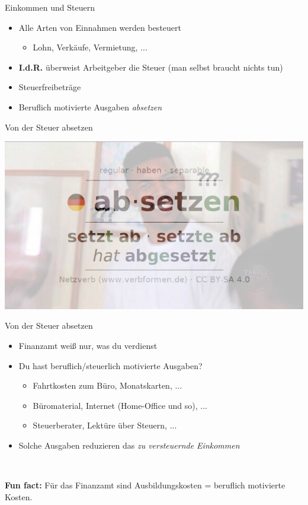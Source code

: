 \documentclass{beamer}
\newcommand{\n}{\hfill\\\vspace{0.25cm}}
\begin{document}
			\begin{frame}{Einkommen und Steuern}
				\begin{itemize}
					\item Alle Arten von Einnahmen werden besteuert
					\begin{itemize}
						\item Lohn, Verkäufe, Vermietung, ...
					\end{itemize}
					\item \textbf{I.d.R.} überweist Arbeitgeber die Steuer (man selbst braucht nichts tun)
					\item Steuerfreibeträge
					\item Beruflich motivierte Ausgaben \textit{absetzen}
				\end{itemize}
			\end{frame}
		
			\begin{frame}{Von der Steuer absetzen}
				\begin{center}
					\includegraphics[width=0.75\linewidth]{images/absetzen}
				\end{center}
			\end{frame}
		
			\begin{frame}{Von der Steuer absetzen}
				\begin{itemize}
					\item Finanzamt weiß nur, was du verdienst
					\item Du hast beruflich/steuerlich motivierte Ausgaben?
					\begin{itemize}
						\item Fahrtkosten zum Büro, Monatskarten, ...
						\item Büromaterial, Internet (Home-Office und so), ...
						\item Steuerberater, Lektüre über Steuern, ...
					\end{itemize}
					\item Solche Ausgaben reduzieren das \textit{zu versteuernde Einkommen}
				\end{itemize}\n
				
				\textbf{Fun fact:} Für das Finanzamt sind Ausbildungskosten = beruflich motivierte Kosten.
			\end{frame}
				
\end{document}
